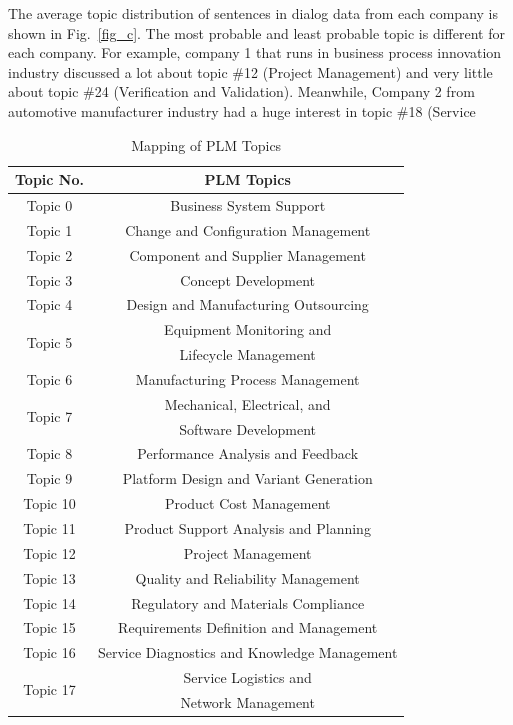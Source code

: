 \documentclass[10pt, conference, compsocconf]{IEEEtran}
\begin{document}
The average topic distribution of sentences in dialog data from each company is shown in Fig.~\ref{fig_c}. The most probable and least probable topic is different for each company. For example, company 1 that runs in business process innovation industry discussed a lot about topic \#12 (Project Management) and very little about topic \#24 (Verification and Validation). Meanwhile, Company 2 from automotive manufacturer industry had a huge interest in topic \#18 (Service \begin{table}[h]
\renewcommand{\arraystretch}{1.3}
\caption{Mapping of PLM Topics}
\label{table 5: mapping plm}
\centering
{\begin{tabular}{|c|c|}
\hline
\textbf{Topic No.}&\textbf{PLM Topics}\\
\hline
Topic 0&Business System Support  \\
\hline
Topic 1&Change and Configuration Management \\
\hline
Topic 2&Component and Supplier Management \\
\hline
Topic 3&Concept Development \\
\hline
Topic 4&Design and Manufacturing Outsourcing \\
\hline
\multirow{2}{*}{Topic 5}&Equipment Monitoring and\\
&Lifecycle Management \\
\hline
Topic 6&Manufacturing Process Management \\
\hline
\multirow{2}{*}{Topic 7}&Mechanical, Electrical, and \\
&Software Development \\
\hline
Topic 8&Performance Analysis and Feedback \\
\hline
Topic 9&Platform Design and Variant Generation \\
\hline
Topic 10&Product Cost Management \\
\hline
Topic 11&Product Support Analysis and Planning \\
\hline
Topic 12&Project Management \\
\hline
Topic 13&Quality and Reliability Management \\
\hline
Topic 14&Regulatory and Materials Compliance \\
\hline
Topic 15&Requirements Definition and Management \\
\hline
Topic 16&Service Diagnostics and Knowledge Management \\
\hline
\multirow{2}{*}{Topic 17}&Service Logistics and\\
&Network Management \\

\end{tabular}}
\end{table}
\end{document}
